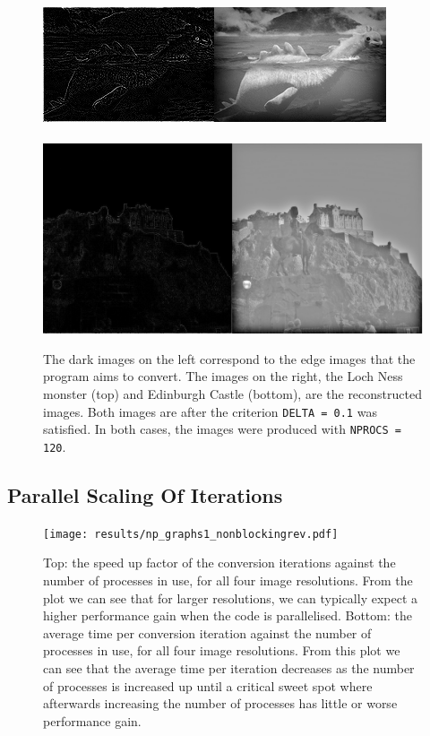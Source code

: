 \documentclass[11pt, a4paper]{article}
\begin{document}
					
			\begin{figure}
				\centering
				\includegraphics[scale=0.805]{image1.png}
				~\\~\\
				\includegraphics[scale=0.20]{image4.png}
				\caption{The dark images on the left correspond to the edge images that the program aims to convert. The images on the right, the Loch Ness monster (top) and Edinburgh Castle (bottom), are the reconstructed images. Both images are after the criterion \texttt{DELTA = 0.1} was satisfied. In both cases, the images were produced with \texttt{NPROCS = 120}.}
				\label{fig:before_after_images}
			\end{figure}

		\subsection{Parallel Scaling Of Iterations}	
			\begin{figure}
				\centering
				\texttt{[image: results/np\_graphs1\_nonblockingrev.pdf]}
				\caption{Top: the speed up factor of the conversion iterations against the number of processes in use, for all four image resolutions. From the plot we can see that for larger resolutions, we can typically expect a higher performance gain when the code is parallelised. Bottom: the average time per conversion iteration against the number of processes in use, for all four image resolutions. From this plot we can see that the average time per iteration decreases as the number of processes is increased up until a critical sweet spot where afterwards increasing the number of processes has little or worse performance gain.}
				\label{fig:np_runtime1}
			\end{figure}
\end{document}
